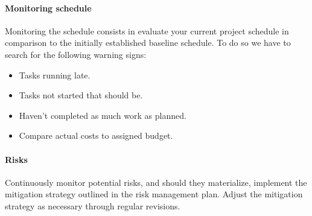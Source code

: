 \paragraph*{Monitoring schedule}
Monitoring the schedule consists in evaluate your current project schedule in comparison to the initially established baseline schedule.
To do so we have to search for the following warning signs: 
\begin{itemize}
    \item Tasks running late.
    \item Tasks not started that should be.
    \item Haven't completed as much work as planned.
    \item Compare actual costs to assigned budget.
\end{itemize}

\paragraph*{Risks}
Continuously monitor potential risks, and should they materialize, implement the mitigation strategy outlined in the risk management plan. 
Adjust the mitigation strategy as necessary through regular revisions.

